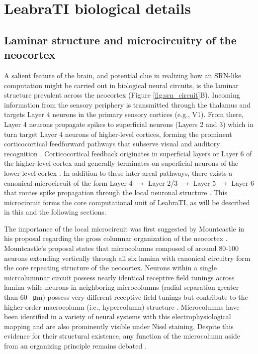 \documentclass[dwyatte_dissertation.tex]{subfiles}
\begin{document}
\section{LeabraTI biological details}

\subsection{Laminar structure and microcircuitry of the neocortex}
A salient feature of the brain, and potential clue in realizing how an SRN-like computation might be carried out in biological neural circuits, is the laminar structure prevalent across the neocortex (Figure \ref{fig:srn_circuit}B). Incoming information from the sensory periphery is transmitted through the thalamus and targets Layer 4 neurons in the primary sensory cortices (e.g., V1). From there, Layer 4 neurons propagate spikes to superficial neurons (Layers 2 and 3) which in turn target Layer 4 neurons of higher-level cortices, forming the prominent corticocortical feedforward pathways that subserve visual and auditory recognition \cite{FellemanVanEssen91}. Corticocortical feedback originates in superficial layers or Layer 6 of the higher-level cortex and generally terminates on superficial neurons of the lower-level cortex \cite{RocklandPandya79}. In addition to these inter-areal pathways, there exists a canonical microcircuit of the form Layer 4 $\rightarrow$ Layer 2/3 $\rightarrow$ Layer 5 $\rightarrow$ Layer 6 that routes spike propagation through the local neuronal structure \cite{DouglasMartin04,ThomsonLamy07,DacostaMartin10}. This microcircuit forms the core computational unit of LeabraTI, as will be described in this and the following sections.

The importance of the local microcircuit was first suggested by Mountcastle in his proposal regarding the gross columnar organization of the neocortex \cite[see][for a comprehensive review]{Mountcastle97}. Mountcastle's proposal states that microcolumns composed of around 80-100 neurons extending vertically through all six lamina with canonical circuitry form the core repeating structure of the neocortex. Neurons within a single micrcolumnnar circuit possess nearly identical receptive field tunings across lamina while neurons in neighboring microcolumns (radial separation greater than 60 \SI{}{\micro\meter}) possess very different receptive field tunings but contribute to the higher-order macrocolumn (i.e., hypercolumn) structure \cite{HubelWiesel77,Jones00}. Microcolumns have been identified in a variety of neural systems with this electrophysiological mapping and are also prominently visible under Nissl staining. Despite this evidence for their structural existence, any function of the microcolumn aside from an organizing principle remains debated \cite{BuxhoevedenCasanova02,HortonAdams05}.
\end{document}
